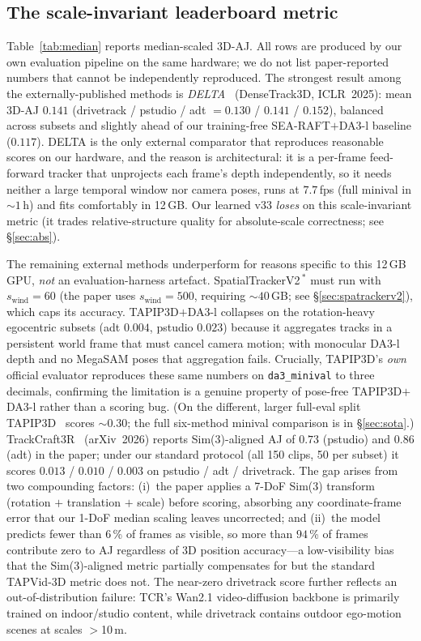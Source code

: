 \documentclass[11pt,a4paper]{article}
\begin{document}
\subsection{The scale-invariant leaderboard metric}
Table~\ref{tab:median} reports median-scaled 3D-AJ.
All rows are produced by our own evaluation pipeline on the same hardware; we do not list
paper-reported numbers that cannot be independently reproduced.
The strongest result among the externally-published methods is \emph{DELTA}~\cite{delta}
(DenseTrack3D, ICLR~2025): mean 3D-AJ $0.141$ (drivetrack / pstudio / adt $=0.130$ / $0.141$ / $0.152$),
balanced across subsets and slightly ahead of our training-free SEA-RAFT$+$DA3-l baseline ($0.117$).
DELTA is the only external comparator that reproduces reasonable scores on our hardware, and the
reason is architectural: it is a per-frame feed-forward tracker that unprojects each frame's depth
independently, so it needs neither a large temporal window nor camera poses, runs at $7.7$\,fps
(full minival in ${\sim}1$\,h) and fits comfortably in 12\,GB.
Our learned v33 \emph{loses} on this scale-invariant metric (it trades relative-structure quality
for absolute-scale correctness; see \S\ref{sec:abs}).

The remaining external methods underperform for reasons specific to this 12\,GB GPU, \emph{not} an
evaluation-harness artefact. SpatialTrackerV2\,$^{*}$ must run with $s_{\text{wind}}{=}60$ (the paper
uses $s_{\text{wind}}{=}500$, requiring ${\sim}40$\,GB; see \S\ref{sec:spatrackerv2}), which caps its
accuracy. TAPIP3D$+$DA3-l collapses on the rotation-heavy egocentric subsets (adt $0.004$, pstudio
$0.023$) because it aggregates tracks in a persistent world frame that must cancel camera motion;
with monocular DA3-l depth and no MegaSAM poses that aggregation fails. Crucially, TAPIP3D's \emph{own}
official evaluator reproduces these same numbers on \texttt{da3\_minival} to three decimals, confirming
the limitation is a genuine property of pose-free TAPIP3D$+$DA3-l rather than a scoring bug. (On the
different, larger full-eval split TAPIP3D~\cite{tapip3d} scores ${\sim}0.30$; the full six-method
minival comparison is in \S\ref{sec:sota}.)
TrackCraft3R~\cite{trackcraft3r} (arXiv~2026) reports Sim(3)-aligned AJ of $0.73$ (pstudio) and
$0.86$ (adt) in the paper; under our standard protocol (all 150 clips, 50 per subset) it scores
$0.013$ / $0.010$ / $0.003$ on pstudio / adt / drivetrack.
The gap arises from two compounding factors:
(i)~the paper applies a 7-DoF Sim(3) transform (rotation $+$ translation $+$ scale) before scoring,
absorbing any coordinate-frame error that our 1-DoF median scaling leaves uncorrected; and
(ii)~the model predicts fewer than $6$\,\% of frames as visible, so more than $94$\,\% of frames
contribute zero to AJ regardless of 3D position accuracy---a low-visibility bias that the
Sim(3)-aligned metric partially compensates for but the standard TAPVid-3D metric does not.
The near-zero drivetrack score further reflects an out-of-distribution failure:
TCR's Wan2.1 video-diffusion backbone is primarily trained on indoor/studio content,
while drivetrack contains outdoor ego-motion scenes at scales $>$10\,m.
\end{document}
